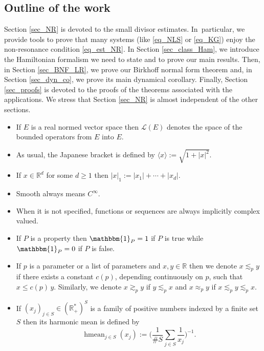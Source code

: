 \documentclass[JEP,XML,SOM,Unicode,NoEqCountersInSection,published]{cedram}
\theoremstyle{definition}
\begin{document}
\subsection{Outline of the work} Section \ref{sec_NR} is devoted to the small divisor estimates. In~particular, we provide tools to prove that many systems (like \eqref{eq_NLS} or \eqref{eq_KG}) enjoy the non-resonance condition \eqref{eq_est_NR}. In Section \ref{sec_class_Ham}, we introduce the Hamiltonian formalism we need to state and to prove our main results. Then, in Section \ref{sec_BNF_LR}, we prove our Birkhoff normal form theorem and, in Section \ref{sec_dyn_co}, we prove its main dynamical corollary. Finally, Section \ref{sec_proofs} is devoted to the proofs of the theorems associated with the applications. We stress that Section \ref{sec_NR} is almost independent of the other sections.


\begin{itemize}
\item
If $E$ is a real normed vector space then $\mathscr{L}(E)$ denotes the space of the bounded operators from $E$ into $E$.

\item
As usual, the Japanese bracket is defined by $\langle x\rangle:= \sqrt{1+|x|^2}$.

\item
If $x\in \mathbb{R}^d$ for some $d\geq 1$ then $|x|_1:=|x_1|+\cdots+|x_d|$.

\item
Smooth always means $C^\infty$.

\item
When it is not specified, functions or sequences are always implicitly complex valued.

\item
If $P$ is a property then $\mathbbm{1}_P = 1$ if $P$ is true while $\mathbbm{1}_P = 0$ if $P$ is false.

\item
If $p$ is a parameter or a list of parameters and $x,y\in \mathbb{R}$ then we denote $x\lesssim_p y$ if there exists a constant $c(p)$, depending continuously on $p$, such that $x\leq c(p) \, y$. Similarly, we denote $x\gtrsim_p y$ if $y\lesssim_p x$ and $x\approx_p y$ if $x\lesssim_p y\lesssim_p x$.

\item
If $(x_j)_{j\in S} \in (\mathbb{R}_{+}^*)^S$ is a family of positive numbers indexed by a finite set $S$ then its harmonic mean is defined by
\begin{equation}
\label{eq_def_hmean}
\mathop{\mathrm{hmean}}_{j\in S} (x_j):=\biggl(\frac1{\# S} \sum_{j\in S} \frac1{x_j} \biggr)^{-1}.
\end{equation}
\end{itemize}
\end{document}
